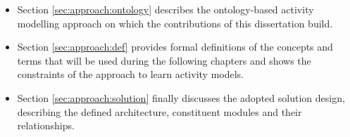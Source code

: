\begin{itemize}
 \item Section \ref{sec:approach:ontology} describes the ontology-based activity modelling approach on which the contributions of this dissertation build. %
 \item Section \ref{sec:approach:def} provides formal definitions of the concepts and terms that will be used during the following chapters and shows the constraints of the approach to learn activity models. %
 \item Section \ref{sec:approach:solution} finally discusses the adopted solution design, describing the defined architecture, constituent modules and their relationships. %
\end{itemize}

